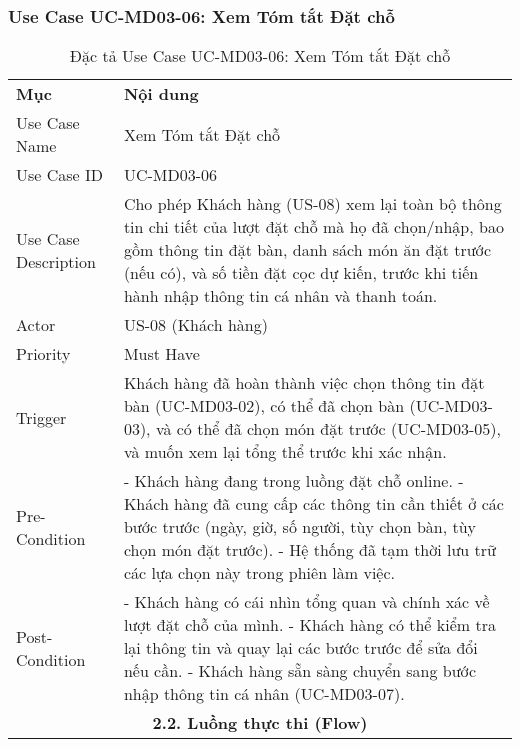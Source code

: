 \subsubsection{Use Case UC-MD03-06: Xem Tóm tắt Đặt chỗ}

\begin{longtable}{|m{4cm}|p{11cm}|}
\caption{Đặc tả Use Case UC-MD03-06: Xem Tóm tắt Đặt chỗ} \label{tab:uc_md03_06} \\
\hline

\endhead %
\hline
\endfoot %
\hline
\endlastfoot %
\multicolumn{2}{|c|}{\textbf{2.1. Tóm tắt (Summary)}} \\
\hline
\textbf{Mục} & \textbf{Nội dung} \\
\hline
Use Case Name & Xem Tóm tắt Đặt chỗ \\
\hline
Use Case ID & UC-MD03-06 \\
\hline
Use Case Description & Cho phép Khách hàng (US-08) xem lại toàn bộ thông tin chi tiết của lượt đặt chỗ mà họ đã chọn/nhập, bao gồm thông tin đặt bàn, danh sách món ăn đặt trước (nếu có), và số tiền đặt cọc dự kiến, trước khi tiến hành nhập thông tin cá nhân và thanh toán. \\
\hline
Actor & US-08 (Khách hàng) \\
\hline
Priority & Must Have \\
\hline
Trigger & Khách hàng đã hoàn thành việc chọn thông tin đặt bàn (UC-MD03-02), có thể đã chọn bàn (UC-MD03-03), và có thể đã chọn món đặt trước (UC-MD03-05), và muốn xem lại tổng thể trước khi xác nhận. \\
\hline
Pre-Condition & - Khách hàng đang trong luồng đặt chỗ online. \newline - Khách hàng đã cung cấp các thông tin cần thiết ở các bước trước (ngày, giờ, số người, tùy chọn bàn, tùy chọn món đặt trước). \newline - Hệ thống đã tạm thời lưu trữ các lựa chọn này trong phiên làm việc. \\
\hline
Post-Condition & - Khách hàng có cái nhìn tổng quan và chính xác về lượt đặt chỗ của mình. \newline - Khách hàng có thể kiểm tra lại thông tin và quay lại các bước trước để sửa đổi nếu cần. \newline - Khách hàng sẵn sàng chuyển sang bước nhập thông tin cá nhân (UC-MD03-07). \\
\hline
\multicolumn{2}{|c|}{\textbf{2.2. Luồng thực thi (Flow)}} \\

\end{longtable}
